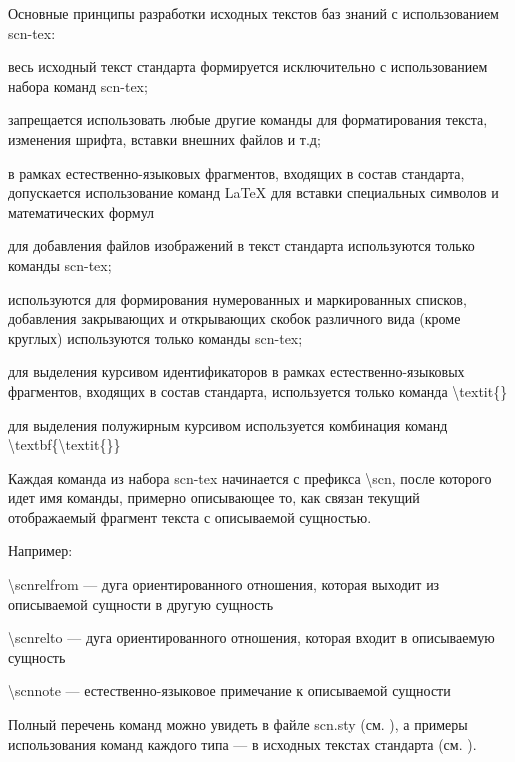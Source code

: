 Основные принципы разработки исходных текстов баз знаний с использованием scn-tex:
\begin{textitemize}
	\item весь исходный текст стандарта формируется исключительно с использованием набора команд scn-tex;
	\item запрещается использовать любые другие команды для форматирования текста, изменения шрифта, вставки внешних файлов и т.д;
	\item в рамках естественно-языковых фрагментов, входящих в состав стандарта, допускается использование команд LaTeX для вставки специальных символов и математических формул
	\item для добавления файлов изображений в текст стандарта используются только команды scn-tex;
	\item используются для формирования нумерованных и маркированных списков, добавления закрывающих и открывающих скобок различного вида (кроме круглых) используются только команды scn-tex;
	\item для выделения курсивом идентификаторов в рамках естественно-языковых фрагментов, входящих в состав стандарта, используется только команда \textbackslash textit\{\}
	\item для выделения полужирным курсивом используется комбинация команд \textbackslash textbf\{\textbackslash textit\{\}\}
\end{textitemize}

Каждая команда из набора scn-tex начинается с префикса \textbackslash scn, после которого идет имя команды, примерно описывающее то, как связан текущий отображаемый фрагмент текста с описываемой сущностью. 

Например:
\begin{textitemize}
	\item \textbackslash scnrelfrom --- дуга ориентированного отношения, которая выходит из описываемой сущности в другую сущность
	\item \textbackslash scnrelto --- дуга ориентированного отношения, которая входит в описываемую сущность
	\item \textbackslash scnnote --- естественно-языковое примечание к описываемой сущности
\end{textitemize}

Полный перечень команд можно увидеть в файле scn.sty (см. ), а примеры использования команд каждого типа --- в исходных текстах стандарта (см. ).

